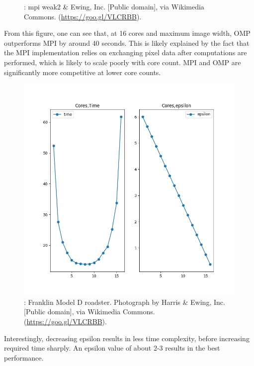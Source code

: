 \begin{figure}[h]
\begin{minipage}{0.45\linewidth}
  \caption{: mpi weak2 \&
    Ewing, Inc. [Public domain], via Wikimedia
    Commons. (\url{https://goo.gl/VLCRBB}).}
    \label{fig:mpi_weak2}
    \end{minipage}
\end{figure}

From this figure, one can see that, at 16 cores and maximum image width, OMP outperforms MPI by around 40 seconds. This is likely explained by the fact that the MPI implementation relies on exchanging pixel data after computations are performed, which is likely to scale poorly with core count. MPI and OMP are significantly more competitive at lower core counts.


\begin{figure}[h]
  \centering
  \includegraphics[width=0.75\linewidth]{omp_weak.out}
  \caption{: Franklin Model D roadster. Photograph by Harris \&
    Ewing, Inc. [Public domain], via Wikimedia
    Commons. (\url{https://goo.gl/VLCRBB}).}
    \label{fig:omp_weak}
\end{figure}


Interestingly, decreasing epsilon results in less time complexity, before increasing required time sharply. An epsilon value of about 2-3 results in the best performance.



